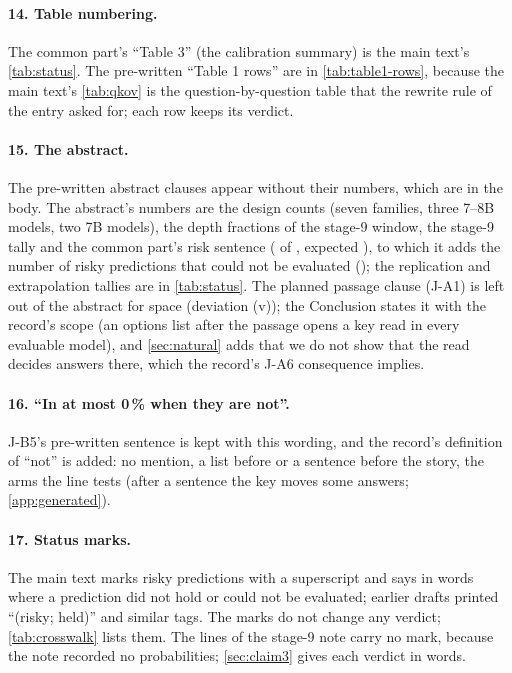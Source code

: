 \paragraph{14. Table numbering.} The common part's ``Table 3'' (the calibration summary) is the main text's \cref{tab:status}. The pre-written ``Table 1 rows'' are in \cref{tab:table1-rows}, because the main text's \cref{tab:qkov} is the question-by-question table that the rewrite rule of the entry asked for; each row keeps its verdict.

\paragraph{15. The abstract.} The pre-written abstract clauses appear without their numbers, which are in the body. The abstract's numbers are the design counts (seven families, three 7--8B models, two 7B models), the depth fractions of the stage-9 window, the stage-9 tally and the common part's risk sentence (\JxRiskyMetABCD{} of \JxRiskyVerdABCD{}, expected \JxRiskyExpABCD{}), to which it adds the number of risky predictions that could not be evaluated (\JxRiskyNotEvalABCD{}); the replication and extrapolation tallies are in \cref{tab:status}. The planned passage clause (J-A1) is left out of the abstract for space (deviation (v)); the Conclusion states it with the record's scope (an options list after the passage opens a key read in every evaluable model), and \cref{sec:natural} adds that we do not show that the read decides answers there, which the record's J-A6 consequence implies.

\paragraph{16. ``In at most 0\,\% when they are not''.} J-B5's pre-written sentence is kept with this wording, and the record's definition of ``not'' is added: no mention, a list before or a sentence before the story, the arms the line tests (after a sentence the key moves some answers; \cref{app:generated}).

\paragraph{17. Status marks.} The main text marks risky predictions with a superscript \rsk{} and says in words where a prediction did not hold or could not be evaluated; earlier drafts printed ``(risky; held)'' and similar tags. The marks do not change any verdict; \cref{tab:crosswalk} lists them. The lines of the stage-9 note carry no mark, because the note recorded no probabilities; \cref{sec:claim3} gives each verdict in words.

